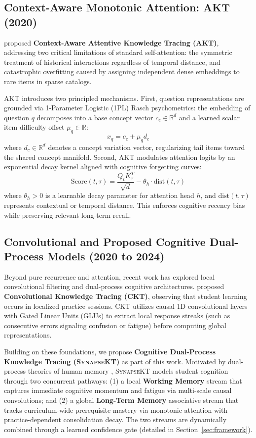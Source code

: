 \documentclass[11pt]{article}
\begin{document}
\subsection{Context-Aware Monotonic Attention: AKT (2020)}
\citet{ghosh2020context} proposed \textbf{Context-Aware Attentive Knowledge Tracing (\textsc{AKT})}, addressing two critical limitations of standard self-attention: the symmetric treatment of historical interactions regardless of temporal distance, and catastrophic overfitting caused by assigning independent dense embeddings to rare items in sparse catalogs. 

AKT introduces two principled mechanisms. First, question representations are grounded via 1-Parameter Logistic (1PL) Rasch psychometrics: the embedding of question $q$ decomposes into a base concept vector $c_c \in \mathbb{R}^d$ and a learned scalar item difficulty offset $\mu_q \in \mathbb{R}$:
\begin{equation}
x_q = c_c + \mu_q d_c
\end{equation}
where $d_c \in \mathbb{R}^d$ denotes a concept variation vector, regularizing tail items toward the shared concept manifold. Second, AKT modulates attention logits by an exponential decay kernel aligned with cognitive forgetting curves:
\begin{equation}
\text{Score}(t, \tau) = \frac{Q_t K_\tau^T}{\sqrt{d}} - \theta_h \cdot \text{dist}(t, \tau)
\label{eq:akt_decay}
\end{equation}
where $\theta_h > 0$ is a learnable decay parameter for attention head $h$, and $\text{dist}(t, \tau)$ represents contextual or temporal distance. This enforces cognitive recency bias while preserving relevant long-term recall.

\subsection{Convolutional and Proposed Cognitive Dual-Process Models (2020 to 2024)}
Beyond pure recurrence and attention, recent work has explored local convolutional filtering and dual-process cognitive architectures. \citet{shen2020convolutional} proposed \textbf{Convolutional Knowledge Tracing (\textsc{CKT})}, observing that student learning occurs in localized practice sessions. CKT utilizes causal 1D convolutional layers with Gated Linear Units (GLUs) to extract local response streaks (such as consecutive errors signaling confusion or fatigue) before computing global representations.

Building on these foundations, we propose \textbf{Cognitive Dual-Process Knowledge Tracing (\textsc{SynapseKT})} as part of this work. Motivated by dual-process theories of human memory \citep{baddeley1992working,kahneman2011thinking}, \textsc{SynapseKT} models student cognition through two concurrent pathways: (1) a local \textbf{Working Memory} stream that captures immediate cognitive momentum and fatigue via multi-scale causal convolutions; and (2) a global \textbf{Long-Term Memory} associative stream that tracks curriculum-wide prerequisite mastery via monotonic attention with practice-dependent consolidation decay. The two streams are dynamically combined through a learned confidence gate (detailed in Section~\ref{sec:framework}).
\end{document}
